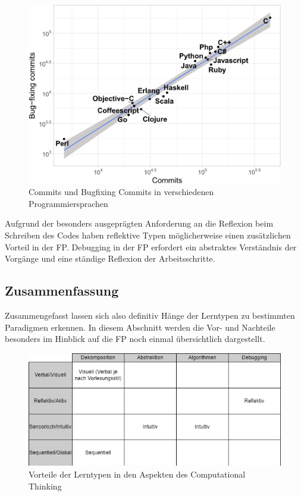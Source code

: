\begin{figure}[H]
    \centering
    \includegraphics[width=1\linewidth]{Figures/Section_3/FigBugCommitsFP}
    \caption{Commits und Bugfixing Commits in verschiedenen Programmiersprachen \protect\cite{berger}}
\end{figure}

Aufgrund der besonders ausgeprägten Anforderung an die Reflexion beim Schreiben des Codes haben reflektive Typen möglicherweise einen zusätzlichen Vorteil in der FP.
Debugging in der FP erfordert ein abstraktes Verständnis der Vorgänge und eine ständige Reflexion der Arbeitsschritte.

\subsection{Zusammenfassung}
Zusammengefasst lassen sich also definitiv Hänge der Lerntypen zu bestimmten Paradigmen erkennen. In diesem Abschnitt werden die Vor- und Nachteile besonders im Hinblick auf die FP noch einmal übersichtlich dargestellt.

\begin{figure}[H]
    \centering
    \includegraphics[width=1\linewidth]{Figures/Section_3/Styles_CT}
    \caption{Vorteile der Lerntypen in den Aspekten des Computational Thinking}
\end{figure}

